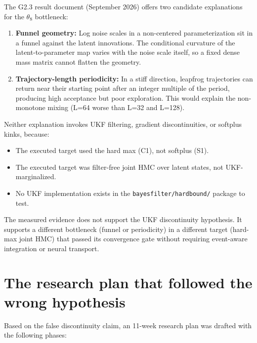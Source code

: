 The G2.3 result document (September 2026) offers two candidate explanations for the $\theta_8$ bottleneck:
\begin{enumerate}
\item \textbf{Funnel geometry:} Log noise scales in a non-centered parameterization sit in a funnel against the latent innovations. The conditional curvature of the latent-to-parameter map varies with the noise scale itself, so a fixed dense mass matrix cannot flatten the geometry.
\item \textbf{Trajectory-length periodicity:} In a stiff direction, leapfrog trajectories can return near their starting point after an integer multiple of the period, producing high acceptance but poor exploration. This would explain the non-monotone mixing (L=64 worse than L=32 and L=128).
\end{enumerate}

Neither explanation invokes UKF filtering, gradient discontinuities, or softplus kinks, because:
\begin{itemize}
\item The executed target used the hard max (C1), not softplus (S1).
\item The executed target was filter-free joint HMC over latent states, not UKF-marginalized.
\item No UKF implementation exists in the \texttt{bayesfilter/hardbound/} package to test.
\end{itemize}

The measured evidence does not support the UKF discontinuity hypothesis. It supports a different bottleneck (funnel or periodicity) in a different target (hard-max joint HMC) that passed its convergence gate without requiring event-aware integration or neural transport.

\section{The research plan that followed the wrong hypothesis}

Based on the false discontinuity claim, an 11-week research plan was drafted with the following phases:

